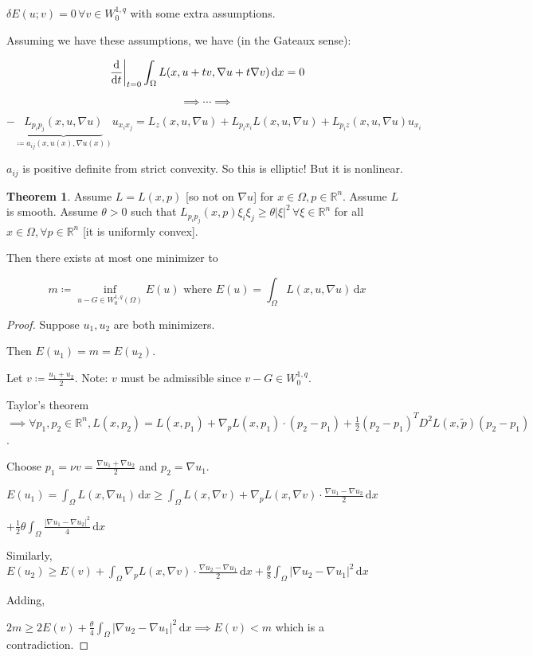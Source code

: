 \documentclass{article}
\theoremstyle{definition}
\newtheorem{theorem}{Theorem}
\begin{document}
\(\delta E(u;v) = 0 \, \forall v\in W_0^{1,q}\) with some extra assumptions.

Assuming we have these assumptions, we have (in the Gateaux sense):

\[
    \eval{\frac{\mathrm{d}}{\mathrm{d}t}}_{t=0} \int_{\Omega} L(x,u + tv, \nabla u + t \nabla v) \,\mathrm{d}x = 0
\] 

\[
    \implies \cdots \implies 
\]

\[
    - \underbrace{L_{p_i p_j}(x,u, \nabla u)}_{\coloneqq a_{ij} (x,u(x),\nabla u(x))} u_{x_i x_j} = L_z (x,u, \nabla u) + L_{p_i x_i} L(x,u, \nabla u) + L_{p_i z}(x,u,\nabla u) u_{x_i}  
\]

\(a_{ij}\) is positive definite from strict convexity. So this is elliptic! But it is nonlinear.

\begin{theorem}
    Assume \(L = L(x,p)\) [so not on \(\nabla u\)] for \(x\in \Omega, p \in \mathbb{R}^n\). Assume \(L\) is smooth. Assume \(\theta > 0\) such that \(L_{p_i p_j} (x,p) \xi _i \xi _j \geq \theta \vert \xi \vert ^2 \, \forall \xi \in \mathbb{R}^n\) for all \(x\in \Omega , \forall p\in \mathbb{R}^n \) [it is uniformly convex].

    Then there exists at most one minimizer to

    \[
        m \coloneqq \inf_{u - G \in W^{1,q}_0(\Omega)} E(u)\text{ where } E(u) = \int_{\Omega} L(x,u,\nabla u) \,\mathrm{d}x 
    \]
\end{theorem}

\begin{proof}
    Suppose \(u_1, u_2\) are both minimizers.

    Then \(E(u_1) = m = E(u_2)\).

    Let \(v \coloneqq \frac{u_1 + u_2}{2}\). Note: \(v\) must be admissible since \(v-G \in W^{1,q}_0\).

    Taylor's theorem \(\implies \forall p_1,p_2 \in \mathbb{R}^n, L(x,p_2) = L(x,p_1) + \nabla_p L(x,p_1) \cdot (p_2 - p_1) + \frac{1}{2} (p_2 - p_1)^T D^2 L(x,\widetilde{p})(p_2 - p_1)\).
    
    Choose \(p_1 = \nu v = \frac{\nabla u_1 + \nabla u_2}{2}\) and \(p_2 = \nabla u_1\).

    \(E(u_1) = \int_{\Omega} L(x,\nabla u_1) \,\mathrm{d}x \geq \int_{\Omega} L(x, \nabla v) + \nabla_p L(x,\nabla v) \cdot \frac{\nabla u_1 - \nabla u_2}{2} \,\mathrm{d}x \)
    
    \(+ \frac{1}{2}\theta \int_{\Omega} \frac{\vert \nabla u_1 - \nabla u_2 \vert^2 }{4} \,\mathrm{d}x  \) 

    Similarly, \(E(u_2) \geq E(v) + \int_{\Omega} \nabla _p L(x,\nabla v) \cdot \frac{\nabla u_2 - \nabla u_1}{2} \,\mathrm{d}x + \frac{\theta }{8} \int_{\Omega} \vert \nabla u_2 - \nabla u_1 \vert ^2 \,\mathrm{d}x \) 

    Adding,

    \(2m \geq 2 E(v) + \frac{\theta }{4} \int_{\Omega} \vert \nabla u_2 - \nabla u_1 \vert ^2 \,\mathrm{d}x \implies E(v) < m\) which is a contradiction.

\end{proof}
\end{document}
